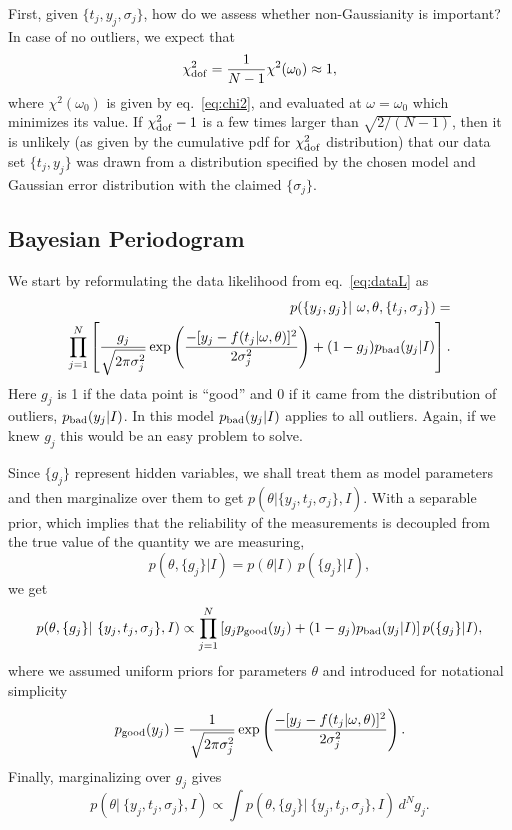 \documentclass[12pt,pdftex]{article}
\begin{document}
First, given $\{t_j, y_j, \sigma_j\}$, how do we assess whether non-Gaussianity is important? 
In case of no outliers, we expect that
\begin{equation}
           \chi^2_{\rm dof} = {1 \over N-1} \chi^2(\omega_0) \approx 1,
\end{equation}
where $\chi^2(\omega_0)$ is given by eq.~\ref{eq:chi2}, and evaluated at $\omega=\omega_0$ which
minimizes its value. If $\chi^2_{\rm dof}-1$ is a few times larger than $\sqrt{2/(N-1)}$, then it is unlikely
(as given by the cumulative pdf for $\chi^2_{\rm dof}$ distribution) that our data set $\{t_j, y_j\}$ was 
drawn from a distribution specified by the chosen model and Gaussian error distribution with 
the claimed $\{\sigma_j\}$.


\subsection{Bayesian Periodogram} 

We start by reformulating the data likelihood from eq.~\ref{eq:dataL}  as
\begin{eqnarray}
\label{eq:dataL2} 
    p(\{y_j, g_j\} |~\omega, \theta, \{t_j, \sigma_j\}) = \nonumber \\ 
  \prod_{j=1}^{N} \left[ \frac{g_j}{\sqrt{2\pi\sigma_j^2}} \exp\left(
  \frac{-[y_j - f(t_j|\omega, \theta)]^2}{2\sigma_j^2}\right) + 
       (1-g_j) p_{\rm bad}(y_j|I) \right].
\end{eqnarray}  
Here $g_j$ is 1 if the data point is ``good'' and 0 if it came from the distribution
of outliers, $p_{\rm bad}(y_j|I)$. In this model $p_{\rm bad}(y_j|I)$ applies to all
outliers. Again, if we knew $g_j$ this would be an easy problem to solve.

Since $\{g_j\}$ represent hidden variables, we shall treat them as model parameters and then
marginalize over them to get $p(\theta|\{y_j, t_j, \sigma_j\} ,I)$. With a separable prior,
which implies that the reliability of the measurements is decoupled from the true value
of the quantity we are measuring,
\begin{equation}
        p(\theta,\{g_j\}|I) = p(\theta|I)  \, p(\{g_j\}|I),
\end{equation}
we get
\begin{equation}
   p(\theta,\{g_j\}|~\{y_j, t_j, \sigma_j\}, I) \propto \prod_{j=1}^{N} \left[ g_j p_{\rm good}(y_j)   + (1-g_j) p_{\rm bad}(y_j|I) \right] p(\{g_j\}|I),
\end{equation}
where we assumed uniform priors for parameters $\theta$ and introduced for notational simplicity
\begin{equation}
       p_{\rm good}(y_j) = \frac{1}{\sqrt{2\pi\sigma_j^2}} \exp\left(
                  \frac{-[y_j - f(t_j|\omega, \theta)]^2}{2\sigma_j^2}\right). 
\end{equation}
Finally, marginalizing over $g_j$ gives
\begin{equation}
  p(\theta|~\{y_j, t_j, \sigma_j\}, I) \propto \int  p(\theta,\{g_j\}|~\{y_j, t_j, \sigma_j\}, I) \, d^N g_j.
\end{equation}
\end{document}
